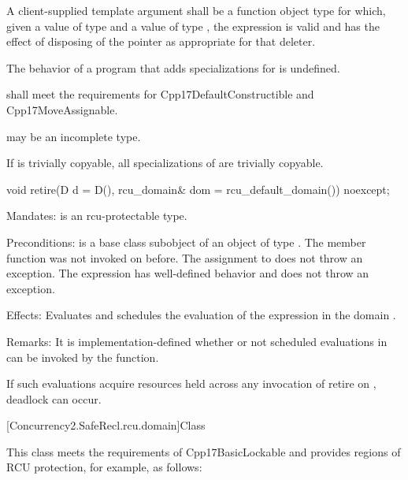 \pnum
A client-supplied template argument  shall be a
function object type  for which,
given a value  of type  and a value 
of type , the expression  is valid and
has the effect of disposing of the pointer as appropriate for
that deleter.

\pnum
The behavior of a program that adds specializations for
 is undefined.

\pnum
{} shall meet the requirements for
Cpp17DefaultConstructible and Cpp17MoveAssignable.

\pnum
{} may be an incomplete type.

\pnum
If  is trivially copyable, all specializations of
 are trivially copyable.

\begin{codeblock}
void retire(D d = D(), rcu_domain& dom = rcu_default_domain()) noexcept;
\end{codeblock}

\pnum
Mandates:  is an rcu-protectable type.

\pnum
Preconditions:  is a base class subobject of
an object  of type . The member function
 was not invoked on 
before. The assignment to  does not throw an
exception. The expression  has
well-defined behavior and does not throw an exception.

\pnum	Effects: Evaluates  and schedules
the evaluation of the expression 
in the domain .

\pnum	Remarks: It is implementation-defined whether or not scheduled
evaluations in  can be invoked by the 
function.
\begin{note}
If such evaluations acquire resources held across any invocation of
retire on , deadlock can occur.
\end{note}

[Concurrency2.SafeRecl.rcu.domain]{Class }


This class meets the requirements of Cpp17BasicLockable  and provides regions of RCU protection, for example, as follows:

